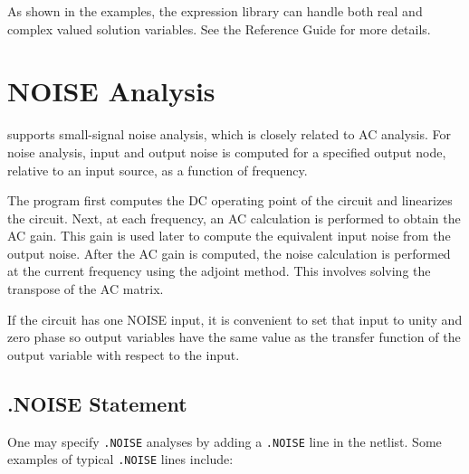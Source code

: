 As shown in the examples, the expression library can handle both real and complex valued solution variables.
See the \Xyce{} Reference Guide\ReferenceGuide{} for more details.  


\section{NOISE Analysis}
\label{NOISE_Analysis}
\label{NOISE_Sweep_Overview}
 
 

\Xyce{} supports small-signal noise analysis, which is closely related
to AC analysis. For noise analysis, input and output noise is computed
for a specified output node, relative to an input source, as a
function of frequency.

The program first computes the DC operating point of the circuit and
linearizes the circuit.  Next, at each frequency, an AC calculation is
performed to obtain the AC gain.  This gain is used later to compute
the equivalent input noise from the output noise.  After the AC gain
is computed, the noise calculation is performed at the current
frequency using the adjoint method.  This involves solving the
transpose of the AC matrix.


If the circuit has one NOISE input, it is convenient to set that input
to unity and zero phase so output variables have the same value as the
transfer function of the output variable with respect to the input.

\subsection{.NOISE Statement}

One may specify \verb|.NOISE| analyses by adding a \verb|.NOISE| line in the netlist.  
Some examples of typical \verb|.NOISE| lines include:


